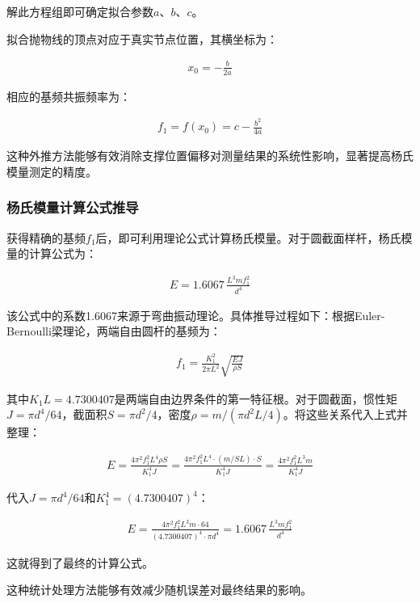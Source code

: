 ﻿\documentclass[12pt,a4paper]{article}
\begin{document}
解此方程组即可确定拟合参数$a$、$b$、$c$。

拟合抛物线的顶点对应于真实节点位置，其横坐标为：

\begin{align}
x_0 = -\frac{b}{2a} \tag{14}
\end{align}

相应的基频共振频率为：

\begin{align}
f_1 = f(x_0) = c - \frac{b^2}{4a} \tag{15}
\end{align}

这种外推方法能够有效消除支撑位置偏移对测量结果的系统性影响，显著提高杨氏模量测定的精度。

\subsubsection{杨氏模量计算公式推导}

获得精确的基频$f_1$后，即可利用理论公式计算杨氏模量。对于圆截面样杆，杨氏模量的计算公式为：

\begin{align}
E = 1.6067\,\frac{L^3 m f_1^2}{d^4} \tag{16}
\end{align}

该公式中的系数1.6067来源于弯曲振动理论。具体推导过程如下：根据Euler-Bernoulli梁理论，两端自由圆杆的基频为：

\begin{align}
f_1 = \frac{K_1^2}{2\pi L^2}\sqrt{\frac{EJ}{\rho S}} \tag{17}
\end{align}

其中$K_1 L = 4.7300407$是两端自由边界条件的第一特征根。对于圆截面，惯性矩$J = \pi d^4/64$，截面积$S = \pi d^2/4$，密度$\rho = m/(\pi d^2 L/4)$。将这些关系代入上式并整理：

\begin{align}
E = \frac{4\pi^2 f_1^2 L^4 \rho S}{K_1^4 J} = \frac{4\pi^2 f_1^2 L^4 \cdot (m/SL) \cdot S}{K_1^4 J} = \frac{4\pi^2 f_1^2 L^3 m}{K_1^4 J} \tag{18}
\end{align}

代入$J = \pi d^4/64$和$K_1^4 = (4.7300407)^4$：

\begin{align}
E = \frac{4\pi^2 f_1^2 L^3 m \cdot 64}{(4.7300407)^4 \cdot \pi d^4} = 1.6067\,\frac{L^3 m f_1^2}{d^4} \tag{19}
\end{align}

这就得到了最终的计算公式。

这种统计处理方法能够有效减少随机误差对最终结果的影响。
\end{document}
